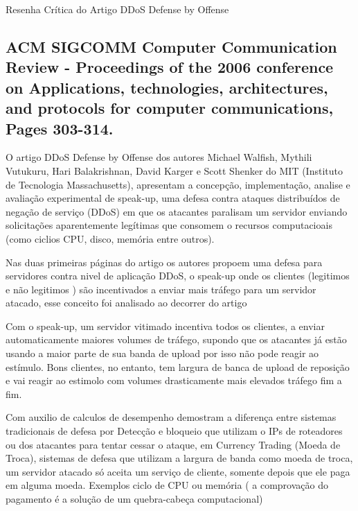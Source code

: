 \documentclass[a4paper,12pt]{article}
\begin{document}
\LARGE
Resenha Crítica do Artigo DDoS Defense by Offense
\large

\subsection*{\textbf{ACM SIGCOMM } Computer Communication Review - Proceedings of the 2006 conference on Applications, technologies, architectures, and protocols for computer communications, Pages 303-314. }

O artigo DDoS Defense by Offense \cite{Walfish:2006:DDO:1151659.1159948} dos autores Michael Walfish, Mythili Vutukuru, Hari Balakrishnan, David Karger  e  Scott Shenker do MIT (Instituto de Tecnologia Massachusetts), apresentam a concepção, implementação, analise e avaliação experimental de speak-up, uma defesa contra ataques distribuídos de negação de serviço (DDoS) em que os atacantes paralisam um servidor enviando solicitações aparentemente legítimas que consomem o recursos computacioais (como ciclios CPU, disco, memória entre outros).

\vspace{0.5cm}

Nas duas primeiras páginas do artigo os autores propoem uma defesa para servidores contra nivel de aplicação DDoS, o speak-up onde os clientes (legitimos e não legitimos ) são incentivados a enviar mais tráfego para um servidor atacado, esse conceito foi analisado ao decorrer do artigo

\vspace{0.5cm}
Com o speak-up, um servidor vitimado incentiva todos os clientes, a  enviar automaticamente maiores volumes de tráfego, supondo que os atacantes já estão usando a maior parte de sua banda de upload por isso não pode reagir ao estímulo. Bons clientes, no entanto, tem largura de banca de upload de reposição e vai reagir ao estimolo com volumes drasticamente mais elevados tráfego fim a fim.
\vspace{0.5cm}

Com auxilio de calculos de desempenho demostram  a diferença entre  sistemas tradicionais de defesa por Detecção e bloqueio que utilizam o IPs de roteadores ou dos atacantes  para tentar cessar o ataque,  em  Currency Trading (Moeda de Troca),  sistemas de defesa que utilizam a largura de banda como moeda de troca,  um servidor atacado só aceita um serviço de cliente, somente depois que ele paga em alguma moeda. Exemplos ciclo de  CPU ou memória ( a comprovação do pagamento é a solução de um quebra-cabeça computacional)
\vspace{0.5cm}
\end{document}
